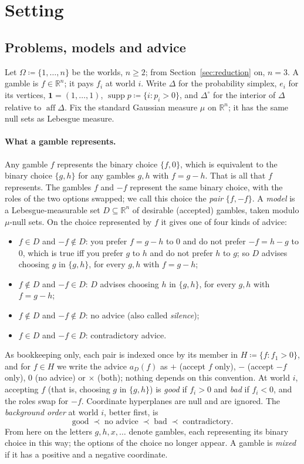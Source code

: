 \documentclass[11pt]{article}
\theoremstyle{definition}
\theoremstyle{remark}
\newcommand{\R}{\mathbb R}
\newcommand{\one}{\mathbf 1}
\newcommand{\Di}{\Delta^{\circ}}
\newcommand{\supp}{\operatorname{supp}}
\newcommand{\aff}{\operatorname{aff}}
\begin{document}
\section{Setting}\label{sec:setting}

\subsection{Problems, models and advice}
Let $\Omega\coloneqq\{1,\dots,n\}$ be the worlds, $n\ge2$; from Section~\ref{sec:reduction} on, $n=3$. A gamble is $f\in\R^n$; it pays $f_i$ at world $i$. Write $\Delta$ for the probability simplex, $e_i$ for its vertices, $\one=(1,\dots,1)$, $\supp p\coloneqq\{i:p_i>0\}$, and $\Di$ for the interior of $\Delta$ relative to $\aff\Delta$. Fix the standard Gaussian measure $\mu$ on $\R^n$; it has the same null sets as Lebesgue measure.

\paragraph{What a gamble represents.} Any gamble $f$ represents the binary choice $\{f,0\}$, which is equivalent to the binary choice $\{g,h\}$ for any gambles $g,h$ with $f=g-h$. That is all that $f$ represents. The gambles $f$ and $-f$ represent the same binary choice, with the roles of the two options swapped; we call this choice the \emph{pair} $\{f,-f\}$. A \emph{model} is a Lebesgue-measurable set $D\subseteq\R^n$ of desirable (accepted) gambles, taken modulo $\mu$-null sets. On the choice represented by $f$ it gives one of four kinds of advice:
\begin{itemize}[leftmargin=*]
\item $f\in D$ and $-f\notin D$: you prefer $f=g-h$ to $0$ and do not prefer $-f=h-g$ to $0$, which is true iff you prefer $g$ to $h$ and do not prefer $h$ to $g$; so $D$ advises choosing $g$ in $\{g,h\}$, for every $g,h$ with $f=g-h$;
\item $f\notin D$ and $-f\in D$: $D$ advises choosing $h$ in $\{g,h\}$, for every $g,h$ with $f=g-h$;
\item $f\notin D$ and $-f\notin D$: no advice (also called \emph{silence});
\item $f\in D$ and $-f\in D$: contradictory advice.
\end{itemize}
As bookkeeping only, each pair is indexed once by its member in $H\coloneqq\{f:f_1>0\}$, and for $f\in H$ we write the advice $a_D(f)$ as $+$ (accept $f$ only), $-$ (accept $-f$ only), $0$ (no advice) or $\times$ (both); nothing depends on this convention. At world $i$, accepting $f$ (that is, choosing $g$ in $\{g,h\}$) is \emph{good} if $f_i>0$ and \emph{bad} if $f_i<0$, and the roles swap for $-f$. Coordinate hyperplanes are null and are ignored. The \emph{background order} at world $i$, better first, is
\[
\text{good}\;\prec\;\text{no advice}\;\prec\;\text{bad}\;\prec\;\text{contradictory}.
\]
From here on the letters $g,h,x,\dots$ denote gambles, each representing its binary choice in this way; the options of the choice no longer appear.
A gamble is \emph{mixed} if it has a positive and a negative coordinate.
\end{document}
